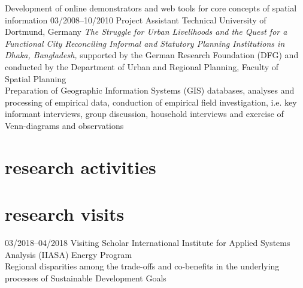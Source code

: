 \documentclass[]{friggeri-cv} %
\begin{document}
\begin{entrylist}
{Development of online demonstrators and web tools for core concepts of spatial information}
\entry
{\small{03/2008--10/2010}}
{Project Assistant}
{Technical University of Dortmund, Germany}
{{\emph{The Struggle for Urban Livelihoods and the Quest for a Functional City Reconciling Informal and Statutory Planning Institutions in Dhaka, Bangladesh,}} supported by the German Research Foundation (DFG) and conducted by the Department of Urban and Regional Planning, Faculty of Spatial Planning\\
Preparation of Geographic Information Systems (GIS) databases, analyses and processing of empirical data, conduction of empirical field investigation, i.e. key informant interviews, group discussion, household interviews and exercise of Venn-diagrams and observations}
\end{entrylist}


\section{research activities}


\section{research visits}

\begin{entrylist}
\entry
{\small{03/2018--04/2018}}
{Visiting Scholar}
{International Institute for Applied Systems Analysis (IIASA)}
{Energy Program \\
Regional disparities among the trade-offs and co-benefits in the underlying processes of Sustainable Development Goals}
\end{entrylist}

\newpage
\end{document}
